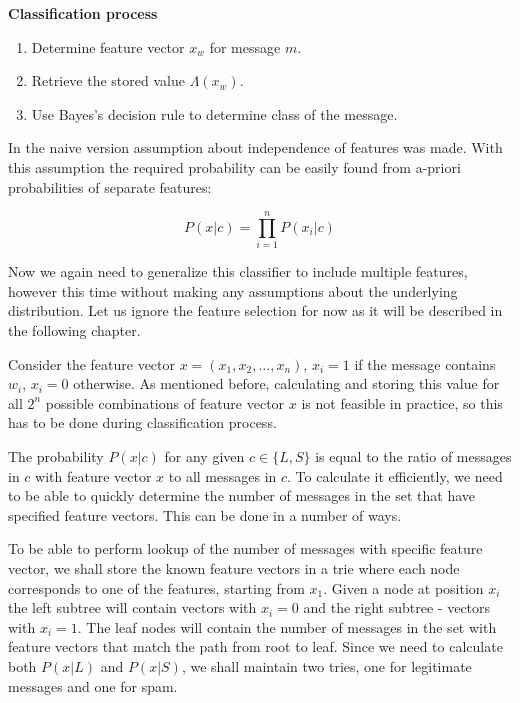 \documentclass[12pt]{report}
\makeatletter
\renewcommand{\subsection}{\@startsection{subsection}{2}{0mm}{-\baselineskip}{-5pt}{\bf}}
\makeatother
\begin{document}
\textbf{Classification process}

\begin{enumerate}
	\item Determine feature vector $x_w$ for message $m$.
	\item Retrieve the stored value $\Lambda(x_w)$.
	\item Use Bayes's decision rule to determine class of the message.
\end{enumerate}

In the naive version assumption about independence of features was made. With this assumption the required probability can be easily found from a-priori probabilities of separate features:

$$P(x | c) = \prod_{i=1}^{n}P(x_i | c)$$

Now we again need to generalize this classifier to include multiple features, however this time without making any assumptions about the underlying distribution. Let us ignore the feature selection for now as it will be described in the following chapter.

Consider the feature vector $x = (x_1, x_2, \dots, x_n)$, $x_i = 1$ if the message contains $w_i$, $x_i = 0$ otherwise. As mentioned before, calculating and storing this value for all $2^n$ possible combinations of feature vector $x$ is not feasible in practice, so this has to be done during classification process.

The probability $P(x | c)$ for any given $c \in \{L, S\}$ is equal to the ratio of messages in $c$ with feature vector $x$ to all messages in $c$. To calculate it efficiently, we need to be able to quickly determine the number of messages in the set that have specified feature vectors. This can be done in a number of ways.

\subsection{Feature Trie}

To be able to perform lookup of the number of messages with specific feature vector, we shall store the known feature vectors in a trie where each node corresponds to one of the features, starting from $x_1$. Given a node at position $x_i$ the left subtree will contain vectors with $x_i = 0$ and the right subtree - vectors with $x_i = 1$. The leaf nodes will contain the number of messages in the set with feature vectors that match the path from root to leaf. Since we need to calculate both $P(x | L)$ and $P(x | S)$, we shall maintain two tries, one for legitimate messages and one for spam.
\end{document}
